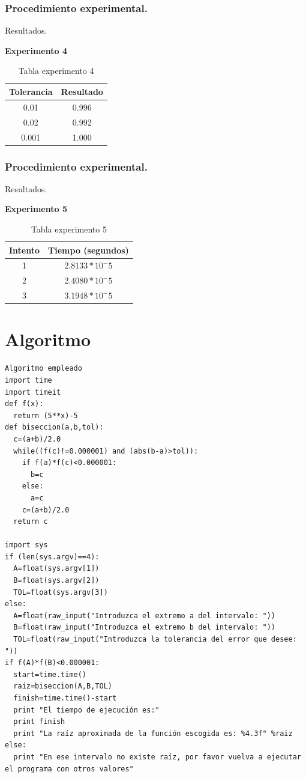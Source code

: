 \documentclass{beamer}
\begin{document}
\begin{frame}
\frametitle{Procedimiento experimental.}
{\LARGE Resultados.}

\textbf{Experimento 4}
\begin{table}[!ht]
\begin{center}
\begin{tabular}{|c|c|}\hline
{\bf Tolerancia} & {\bf Resultado}\\ \hline
0.01 & 0.996\\
0.02 & 0.992\\
0.001 & 1.000\\
\hline
\end{tabular}
\end{center}
\caption{Tabla experimento 4}
\label{Mitabla4}
\end{table}
\end{frame}
\begin{frame}
\frametitle{Procedimiento experimental.}
{\LARGE Resultados.}

\textbf{Experimento 5}
\begin{table}[!ht]
\begin{center}
\begin{tabular}{|c|c|} \hline
\textbf{Intento} & \textbf{Tiempo (segundos)} \\ \hline
1 & $2.8133*10^-5$ \\%
2 & $2.4080*10^-5$ \\%
3 & $3.1948*10^-5$ \\%
\hline
\end{tabular}
\end{center}
\caption{Tabla experimento 5}
\label{Mitabla5}
\end{table}
\end{frame}
\section{Algoritmo}
\tiny{
\begin{verbatim}
Algoritmo empleado
import time
import timeit
def f(x):
  return (5**x)-5
def biseccion(a,b,tol):
  c=(a+b)/2.0
  while((f(c)!=0.000001) and (abs(b-a)>tol)):
    if f(a)*f(c)<0.000001:
      b=c
    else:
      a=c
    c=(a+b)/2.0
  return c

import sys
if (len(sys.argv)==4):
  A=float(sys.argv[1])
  B=float(sys.argv[2])
  TOL=float(sys.argv[3])
else:
  A=float(raw_input("Introduzca el extremo a del intervalo: "))
  B=float(raw_input("Introduzca el extremo b del intervalo: "))
  TOL=float(raw_input("Introduzca la tolerancia del error que desee: "))
if f(A)*f(B)<0.000001:
  start=time.time()
  raiz=biseccion(A,B,TOL)
  finish=time.time()-start
  print "El tiempo de ejecución es:"
  print finish
  print "La raíz aproximada de la función escogida es: %4.3f" %raiz
else:
  print "En ese intervalo no existe raíz, por favor vuelva a ejecutar el programa con otros valores"
\end{verbatim}
}
\end{document}
